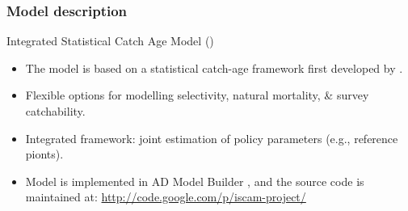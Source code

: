 \subsubsection{Model description} %
\label{ssub:model_description}
%
\begin{frame} {Integrated Statistical Catch Age Model (\iscam)} 
	
		\begin{itemize}
			\item The model is based on a statistical catch-age framework first developed by \cite{fournier1982general}.
			
			\item Flexible options for modelling selectivity, natural mortality, \& survey catchability.
			
			\item Integrated framework: joint estimation of policy parameters (e.g., reference pionts).
			\item Model is implemented in AD Model Builder \cite{ADMB2009}, and the source code is maintained at:  \url{http://code.google.com/p/iscam-project/}
		\end{itemize}

\end{frame}
%
